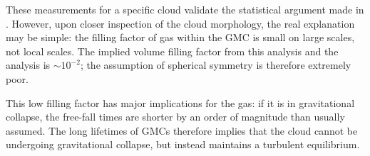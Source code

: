 These measurements for a specific cloud validate the statistical argument made
in \citet{Ginsburg2011a}.  However, upon closer inspection of the cloud
morphology, the real explanation may be simple: the filling factor of gas
within the GMC is small on large scales, not local scales.  The implied volume
filling factor from this analysis and the \citet{Ginsburg2011a} analysis is
$\sim10^{-2}$; the assumption of spherical symmetry is therefore extremely
poor.  

This low filling factor has major implications for the gas: if it is in
gravitational collapse, the free-fall times are shorter by an order of
magnitude than usually assumed.  The long lifetimes of GMCs therefore implies
that the cloud cannot be undergoing gravitational collapse, but instead
maintains a turbulent equilibrium.
